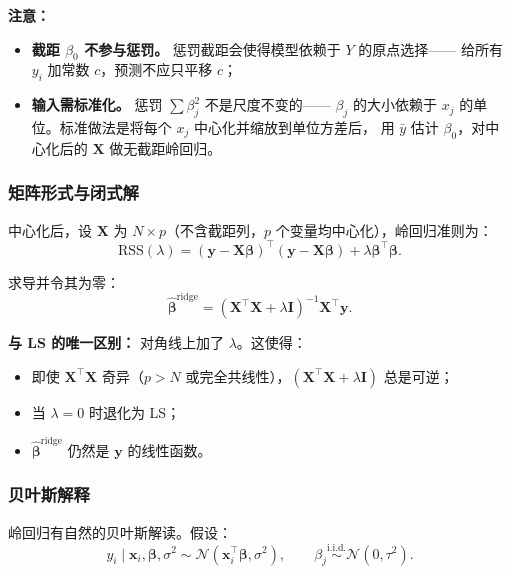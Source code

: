 \textbf{注意：}
\begin{itemize}
    \item \textbf{截距 $\beta_0$ 不参与惩罚。} 惩罚截距会使得模型依赖于 $Y$ 的原点选择——
    给所有 $y_i$ 加常数 $c$，预测不应只平移 $c$；
    \item \textbf{输入需标准化。} 惩罚 $\sum \beta_j^2$ 不是尺度不变的——
    $\beta_j$ 的大小依赖于 $x_j$ 的单位。标准做法是将每个 $x_j$ 中心化并缩放到单位方差后，
    用 $\bar{y}$ 估计 $\beta_0$，对中心化后的 $\mathbf{X}$ 做无截距岭回归。
\end{itemize}

\subsubsection{矩阵形式与闭式解}

中心化后，设 $\mathbf{X}$ 为 $N \times p$（不含截距列，$p$ 个变量均中心化），岭回归准则为：
\begin{equation}\label{eq:ridge_matrix}
    \mathrm{RSS}(\lambda) = (\mathbf{y} - \mathbf{X}\bm{\beta})^\top (\mathbf{y} - \mathbf{X}\bm{\beta})
    + \lambda \bm{\beta}^\top \bm{\beta}.
\end{equation}

求导并令其为零：
\begin{equation}\label{eq:ridge_solution}
    \boxed{\hat{\bm{\beta}}^{\text{ridge}} = (\mathbf{X}^\top \mathbf{X} + \lambda \mathbf{I})^{-1} \mathbf{X}^\top \mathbf{y}}.
\end{equation}

\textbf{与 LS 的唯一区别：} 对角线上加了 $\lambda$。这使得：
\begin{itemize}
    \item 即使 $\mathbf{X}^\top \mathbf{X}$ 奇异（$p > N$ 或完全共线性），$(\mathbf{X}^\top \mathbf{X} + \lambda \mathbf{I})$ 总是可逆；
    \item 当 $\lambda = 0$ 时退化为 LS；
    \item $\hat{\bm{\beta}}^{\text{ridge}}$ 仍然是 $\mathbf{y}$ 的线性函数。
\end{itemize}

\subsubsection{贝叶斯解释}

岭回归有自然的贝叶斯解读。假设：
\[
    y_i \mid \mathbf{x}_i, \bm{\beta}, \sigma^2 \sim \mathcal{N}(\mathbf{x}_i^\top \bm{\beta}, \sigma^2),
    \qquad
    \beta_j \stackrel{\text{i.i.d.}}{\sim} \mathcal{N}(0, \tau^2).
\]

